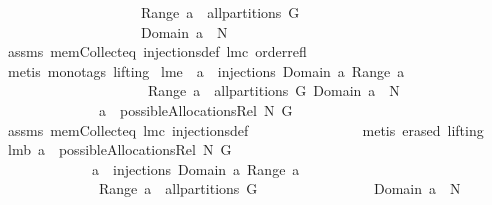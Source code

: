\begin{isabellebody}
\ \ \ \ \ \ \ \ \ \ \ \ \ \ \ \ \ \ \ \ Range\ a\ {\isasymin}\ all{\isacharunderscore}partitions\ G\ {\isacharampersand}\isanewline
\ \ \ \ \ \ \ \ \ \ \ \ \ \ \ \ \ \ \ \ Domain\ a\ {\isasymsubseteq}\ N{\isachardoublequoteclose}\isanewline
%
\isadelimproof
\ \ \ \ \ \ \ \ \ \ \ \ \ %
\endisadelimproof
%
\isatagproof
{}\isamarkupfalse%
\ assms\ mem{\isacharunderscore}Collect{\isacharunderscore}eq\ injections{\isacharunderscore}def\ lm{}{}c\ order{\isacharunderscore}refl\ \isanewline
\ \ \ \ \ \ \ \ \ \ \ \ \ \isamarkupfalse%
\ {\isacharparenleft}metis\ {\isacharparenleft}mono{\isacharunderscore}tags{\isacharcomma}\ lifting{\isacharparenright}{\isacharparenright}%
\endisatagproof
{\isafoldproof}%
%
\isadelimproof
\isanewline
%
\endisadelimproof
\isanewline
{}\isamarkupfalse%
\ lm{}{}e{\isacharcolon}\ \ {\isachardoublequoteopen}a\ {\isasymin}\ injections\ {\isacharparenleft}Domain\ a{\isacharparenright}\ {\isacharparenleft}Range\ a{\isacharparenright}{\isachardoublequoteclose}\ \isanewline
\ \ \ \ \ \ \ \ \ \ \ \ \ \ \ \ \ \ \ \ \ {\isachardoublequoteopen}Range\ a\ {\isasymin}\ all{\isacharunderscore}partitions\ G{\isachardoublequoteclose}\ {\isachardoublequoteopen}Domain\ a\ {\isasymsubseteq}\ N{\isachardoublequoteclose}\ \isanewline
\ \ \ \ \ \ \ \ \ \ \ \ \ \ {\isachardoublequoteopen}a\ {\isasymin}\ possibleAllocationsRel\ N\ G{\isachardoublequoteclose}\ \isanewline
%
\isadelimproof
\ \ \ \ \ \ \ \ \ \ \ \ \ %
\endisadelimproof
%
\isatagproof
{}\isamarkupfalse%
\ assms\ mem{\isacharunderscore}Collect{\isacharunderscore}eq\ lm{}{}c\ injections{\isacharunderscore}def\ \isanewline
\ \ \ \ \ \ \ \ \ \ \ \ \ \isamarkupfalse%
\ {\isacharparenleft}metis\ {\isacharparenleft}erased{\isacharcomma}\ lifting{\isacharparenright}{\isacharparenright}%
\endisatagproof
{\isafoldproof}%
%
\isadelimproof
\isanewline
%
\endisadelimproof
\isanewline
{}\isamarkupfalse%
\ lm{}{}b{\isacharcolon}\ {\isachardoublequoteopen}a\ {\isasymin}\ possibleAllocationsRel\ N\ G\ {\isacharequal}\ \isanewline
\ \ \ \ \ \ \ \ \ \ \ \ \ {\isacharparenleft}a\ {\isasymin}\ injections\ {\isacharparenleft}Domain\ a{\isacharparenright}\ {\isacharparenleft}Range\ a{\isacharparenright}\ \ {\isacharampersand}\ \isanewline
\ \ \ \ \ \ \ \ \ \ \ \ \ \ Range\ a\ {\isasymin}\ all{\isacharunderscore}partitions\ G\ {\isacharampersand}\ \isanewline
\ \ \ \ \ \ \ \ \ \ \ \ \ \ Domain\ a\ {\isasymsubseteq}\ N{\isacharparenright}{\isachardoublequoteclose}\ \isanewline

\end{isabellebody}
